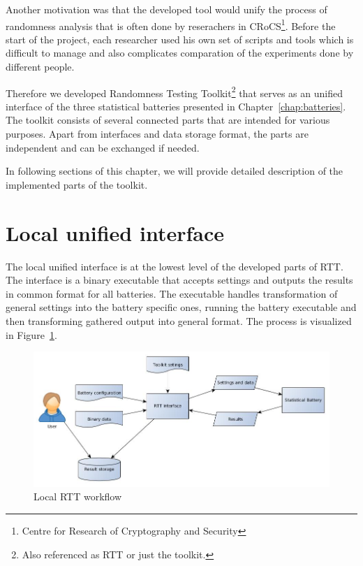 \documentclass[
  digital,  	%
  color,		%
  oneside,   	%
  12pt,
  nocover,
  notable,
  nolof,
  nolot,
]{fithesis3}
\begin{document}
Another motivation was that the developed tool would unify the process of randomness analysis that is often done by reserachers in CRoCS\footnote{Centre for Research of Cryptography and Security}. Before the start of the project, each researcher used his own set of scripts and tools which is difficult to manage and also complicates comparation of the experiments done by different people.

Therefore we developed Randomness Testing Toolkit\footnote{Also referenced as RTT or just the toolkit.} that serves as an unified interface of the three statistical batteries presented in Chapter~\ref{chap:batteries}. The toolkit consists of several connected parts that are intended for various purposes. Apart from interfaces and data storage format, the parts are independent and can be exchanged if needed.

In following sections of this chapter, we will provide detailed description of the implemented parts of the toolkit.

\section{Local unified interface}
The local unified interface is at the lowest level of the developed parts of RTT. The interface is a binary executable that accepts settings and outputs the results in common format for all batteries. The executable handles transformation of general settings into the battery specific ones, running the battery executable and then transforming gathered output into general format. The process is visualized in Figure~\ref{fig:rtt_local_workflow}.

\begin{figure}[h!]
\begin{nomar}
\centering
\includegraphics[width=\paperwidth-4cm]{figures/local_rtt_workflow.jpg}
\end{nomar}
\caption{Local RTT workflow}
\label{fig:rtt_local_workflow}
\end{figure}
\end{document}
